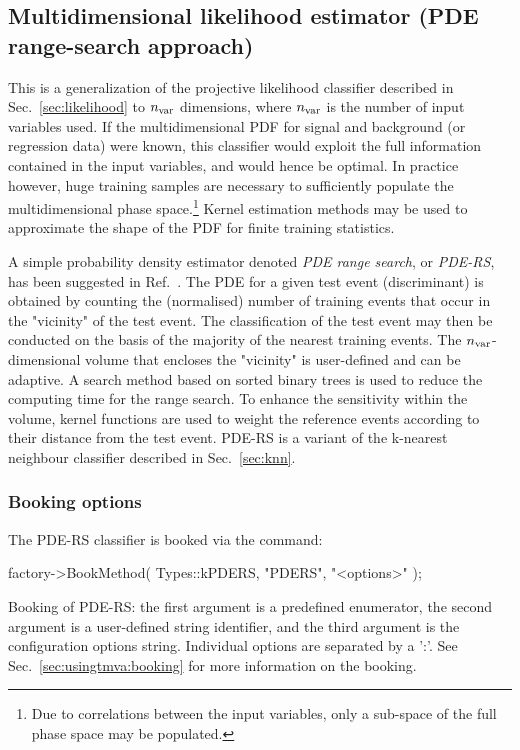\subsection{Multidimensional likelihood estimator (PDE range-search approach)}
\label{sec:pders}

This is a generalization of the projective likelihood classifier described in
Sec.~\ref{sec:likelihood} to ${n_\text{var}}$ dimensions, where ${n_\text{var}}$ is
the number of input variables used. If the multidimensional 
PDF 
for signal and background (or regression data) were known, this classifier 
would exploit the full information contained in the input variables, and  
would hence be optimal. In practice however, huge training samples are necessary 
to sufficiently populate the multidimensional phase space.\footnote
{
	Due to correlations between the input variables, only a sub-space of 
	the full phase space may be populated.
} 
Kernel estimation methods may be used to approximate the shape of the PDF
for finite training statistics.

A simple probability density estimator denoted {\em PDE range search}, or {\em PDE-RS}, 
has been suggested in Ref.~\cite{CarliKoblitz}. The PDE for a given test event (discriminant) 
is obtained by counting the (normalised) number of 
training events that occur in the "vicinity" of the test event. The 
classification of the test event may then be conducted on the basis of the 
majority of the nearest training events. The ${n_\text{var}}$-dimensional
volume that encloses the "vicinity" is user-defined and can be adaptive. A search method 
based on sorted binary trees is used to reduce the computing time for the 
range search. To enhance the sensitivity within the volume, kernel 
functions are used to weight the reference events according to their 
distance from the test event. PDE-RS is a variant of the k-nearest neighbour
classifier described in Sec.~\ref{sec:knn}.

\subsubsection{Booking options}

The PDE-RS classifier is booked via the command:
\begin{codeexample}
\begin{tmvacode}
factory->BookMethod( Types::kPDERS, "PDERS", "<options>" );
\end{tmvacode}
\caption[.]{\codeexampleCaptionSize Booking of PDE-RS: the first argument is a predefined 
		   enumerator, the second argument is a user-defined 
		   string identifier, and the third argument is the configuration options string.
         Individual options are separated by a ':'. 
         See Sec.~\ref{sec:usingtmva:booking} for more information on the booking.}
\end{codeexample}

